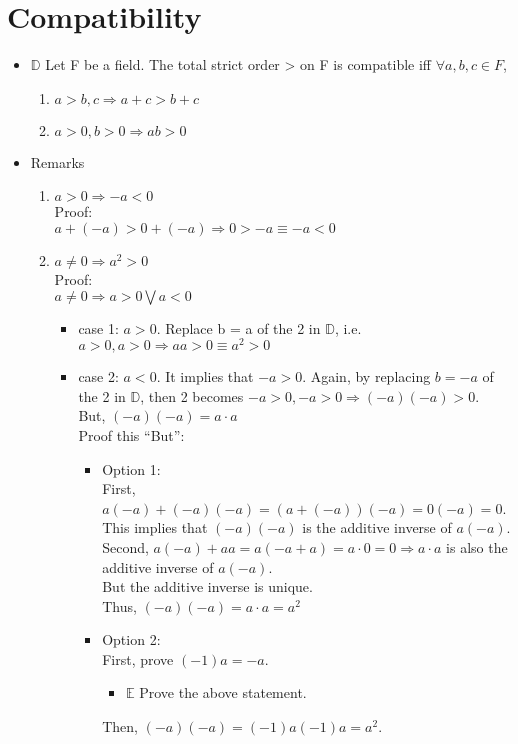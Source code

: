 \documentclass[11pt]{article}
\begin{document}
\section{Compatibility}
\label{sec:orgb52a026}
\begin{itemize}
\item \(\mathbb{D}\) Let F be a field. The total strict order > on F is compatible iff \(\forall a,b,c \in F\),
\begin{enumerate}
\item \(a > b, c \Rightarrow a+c > b+c\)
\item \(a > 0, b > 0 \Rightarrow ab > 0\)
\end{enumerate}

\item Remarks
\begin{enumerate}
\item \(a > 0 \Rightarrow -a < 0\)\\[0pt]
Proof:\\[0pt]
\(a + (-a) > 0 + (-a) \Rightarrow 0 > -a \equiv -a < 0\)
\item \(a \neq 0 \Rightarrow a^{2} > 0\) \\[0pt]
Proof:\\[0pt]
\(a \neq 0 \Rightarrow a > 0 \bigvee a < 0\)\\[0pt]
\begin{itemize}
\item case 1: \(a > 0\). Replace b = a of the 2 in \(\mathbb{D}\), i.e. \(a > 0, a >0 \Rightarrow aa > 0 \equiv a^{2} > 0\)\\[0pt]
\item case 2: \(a < 0\). It implies that \(-a > 0\). Again, by replacing \(b = -a\) of the 2 in \(\mathbb{D}\), then 2 becomes \(-a > 0, -a >0 \Rightarrow (-a)(-a) >0\).\\[0pt]
But, \((-a)(-a) = a\cdot a\)\\[0pt]
Proof this ``But'':\\[0pt]
\begin{itemize}
\item Option 1:\\[0pt]
First, \(a(-a) + (-a)(-a) = (a + (-a))(-a) = 0(-a) = 0\). This implies that \((-a)(-a)\) is the additive inverse of \(a(-a)\).\\[0pt]
Second, \(a(-a) + aa = a(-a + a) = a\cdot 0 = 0 \Rightarrow a\cdot a\) is also the additive inverse of \(a(-a)\).\\[0pt]
But the additive inverse is unique.\\[0pt]
Thus, \((-a)(-a) = a\cdot a = a^{2}\)

\item Option 2:\\[0pt]
First, prove \((-1)a = -a\).\\[0pt]
\begin{itemize}
\item \(\mathbb{E}\) Prove the above statement.
\end{itemize}
Then, \((-a)(-a) = (-1)a(-1)a = a^{2}\).
\end{itemize}
\end{itemize}
\end{enumerate}
\end{itemize}
\end{document}
